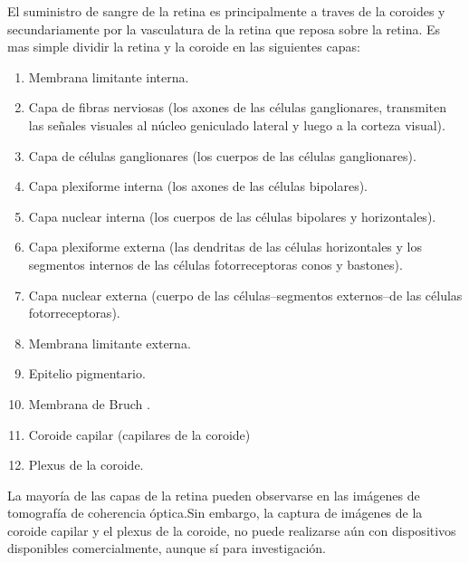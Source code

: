 El suministro de sangre de la retina es principalmente a traves de la coroides y secundariamente por la vasculatura de la retina que reposa sobre la retina. Es mas simple dividir la retina y la coroide en las siguientes capas:
\begin{enumerate}[1.]
    \item Membrana limitante interna.
    \item Capa de fibras nerviosas (los axones de las células ganglionares, transmiten las señales visuales al núcleo geniculado lateral y luego a la corteza visual).
    \item Capa de células ganglionares (los cuerpos de las células ganglionares).
    \item	Capa plexiforme interna (los axones de las células bipolares).
	\item Capa nuclear interna (los cuerpos de las células bipolares y horizontales).
	\item Capa plexiforme externa (las dendritas de las células horizontales y los segmentos internos de las células fotorreceptoras conos y bastones).
	\item Capa nuclear externa (cuerpo de las células--segmentos externos--de las células fotorreceptoras).
	\item Membrana limitante externa.
	\item Epitelio pigmentario.
	\item Membrana de Bruch .
	\item Coroide capilar (capilares de la coroide)
	\item Plexus de la coroide.

\end{enumerate}



La mayoría de las capas de la retina pueden observarse en las imágenes de tomografía de coherencia óptica.Sin embargo, la captura de imágenes de la coroide capilar y el plexus de la coroide, no puede realizarse aún con dispositivos disponibles comercialmente, aunque sí para investigación.\cite{abramoff2010retinal}



